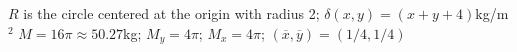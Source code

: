 {$R$ is the circle centered at the origin with radius 2; $\delta(x,y) = (x+y+4)$kg/m$^2$
}
{$M = 16\pi\approx 50.27$kg; $M_y= 4\pi$; $M_x = 4\pi$; $(\overline{x},\overline{y}) = (1/4,1/4)$
}